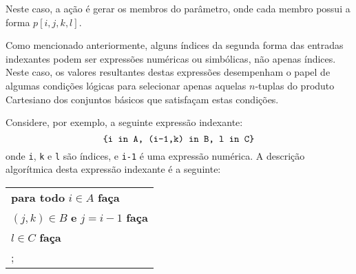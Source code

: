 \documentclass[11pt, brazil]{report}
\begin{document}
\noindent Neste caso, a ação é gerar os membros do parâmetro,
onde cada membro possui a forma $p[i,j,k,l]$.


Como mencionado anteriormente, alguns índices da segunda forma das entradas
indexantes podem ser expressões numéricas ou simbólicas, não apenas índices.
Neste caso, os valores resultantes destas expressões desempenham o papel
de algumas condições lógicas para selecionar apenas aquelas $n$-tuplas
do produto Cartesiano dos conjuntos básicos que satisfaçam estas
condições.


Considere, por exemplo, a seguinte expressão indexante:
$$\mbox{{\tt\{i in A, (i-1,k) in B, l in C\}}}$$
onde {\tt i}, {\tt k} e {\tt l} são índices, e {\tt i-1} é uma
expressão numérica. A descrição algorítmica desta expressão
indexante é a seguinte:


\noindent\hfil
\begin{tabular}{@{}l@{}}
{\bf para todo} $i\in A$ {\bf faça}\\
\hspace{16pt}{\bf para todo} $(j,k)\in B$ {\bf e} $j=i-1$ {\bf faça}\\
\hspace{32pt}{\bf para todo} $l\in C$ {\bf faça}\\
\hspace{48pt}{\it ação};\\
\end{tabular}

\end{document}
